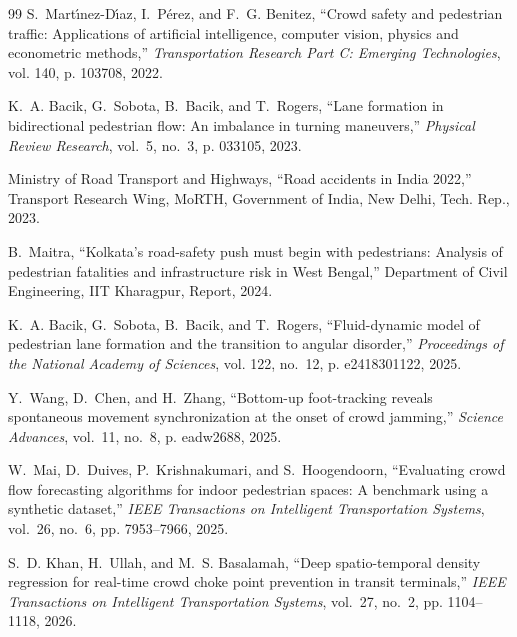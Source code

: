 \documentclass[12pt,a4paper]{article}
\begin{document}
\begin{thebibliography}{99}
S.~Mart{\'\i}nez-D{\'\i}az, I.~P{\'e}rez, and F.~G. Benitez, ``Crowd safety and pedestrian traffic: Applications of artificial intelligence, computer vision, physics and econometric methods,'' \emph{Transportation Research Part C: Emerging Technologies}, vol. 140, p. 103708, 2022.

K.~A. Bacik, G.~Sobota, B.~Bacik, and T.~Rogers, ``Lane formation in bidirectional pedestrian flow: An imbalance in turning maneuvers,'' \emph{Physical Review Research}, vol.~5, no.~3, p. 033105, 2023.

Ministry of Road Transport and Highways, ``Road accidents in India 2022,'' Transport Research Wing, MoRTH, Government of India, New Delhi, Tech. Rep., 2023.

B.~Maitra, ``Kolkata’s road-safety push must begin with pedestrians: Analysis of pedestrian fatalities and infrastructure risk in West Bengal,'' Department of Civil Engineering, IIT Kharagpur, Report, 2024.

K.~A. Bacik, G.~Sobota, B.~Bacik, and T.~Rogers, ``Fluid-dynamic model of pedestrian lane formation and the transition to angular disorder,'' \emph{Proceedings of the National Academy of Sciences}, vol. 122, no.~12, p. e2418301122, 2025.

Y.~Wang, D.~Chen, and H.~Zhang, ``Bottom-up foot-tracking reveals spontaneous movement synchronization at the onset of crowd jamming,'' \emph{Science Advances}, vol.~11, no.~8, p. eadw2688, 2025.

W.~Mai, D.~Duives, P.~Krishnakumari, and S.~Hoogendoorn, ``Evaluating crowd flow forecasting algorithms for indoor pedestrian spaces: A benchmark using a synthetic dataset,'' \emph{IEEE Transactions on Intelligent Transportation Systems}, vol.~26, no.~6, pp. 7953--7966, 2025.

S.~D. Khan, H.~Ullah, and M.~S. Basalamah, ``Deep spatio-temporal density regression for real-time crowd choke point prevention in transit terminals,'' \emph{IEEE Transactions on Intelligent Transportation Systems}, vol.~27, no.~2, pp. 1104--1118, 2026.

\end{thebibliography}
\end{document}
